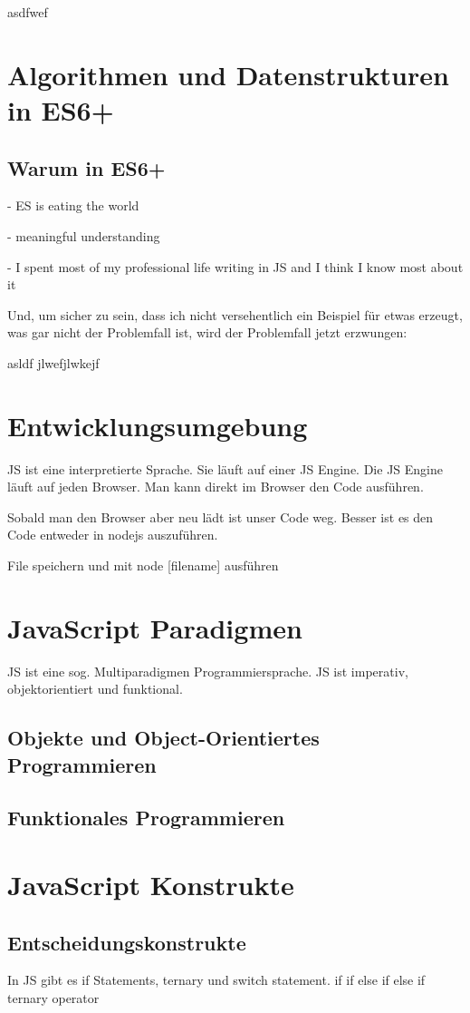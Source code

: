 \documentclass{book}
\begin{document}
\tableofcontents
asdfwef
\chapter{Algorithmen und Datenstrukturen in ES6+}
\section{Warum in ES6+}
- ES is eating the world

- meaningful understanding

- I spent most of my professional life writing in JS and I think I know most about it

Und, um sicher zu sein, dass ich nicht versehentlich ein Beispiel für etwas
erzeugt, was gar nicht der Problemfall ist, wird der Problemfall jetzt
erzwungen:
\clearpage

asldf jlwefjlwkejf 
\chapter{Entwicklungsumgebung}
JS ist eine interpretierte Sprache. Sie läuft auf einer JS Engine. Die JS Engine läuft auf jeden Browser. Man kann direkt im Browser den Code ausführen.

Sobald man den Browser aber neu lädt ist unser Code weg. Besser ist es den Code entweder in nodejs auszuführen.

File speichern und mit node [filename] ausführen
\chapter{JavaScript Paradigmen}
JS ist eine sog. Multiparadigmen Programmiersprache. JS ist imperativ, objektorientiert und funktional. 
\section{Objekte und Object-Orientiertes Programmieren}
\section{Funktionales Programmieren}
\chapter{JavaScript Konstrukte}
\section{Entscheidungskonstrukte}
In JS gibt es if Statements, ternary und switch statement.
if
if else
if else if 
ternary operator
\end{document}
